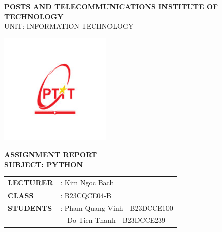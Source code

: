 \documentclass[a4paper,12pt]{article}
\begin{document}

\begin{center}

    {\Large \textbf{POSTS AND TELECOMMUNICATIONS INSTITUTE OF TECHNOLOGY}} \\
    \vspace{0.2cm}
    {\small UNIT: INFORMATION TECHNOLOGY} \\
    \vspace{0.5cm}
    
    \includegraphics[width=0.4\textwidth]{images/logo.png} \\
    \vspace{0.5cm}
    
    {\Large \textbf{ASSIGNMENT REPORT}} \\
    \vspace{0.2cm}
    {\large \textbf{SUBJECT: PYTHON}} \\
    \vspace{1.5cm}
    
    \begin{center}
    \begin{tabular}{ll}
    \vspace{0.3cm}
    
    \textbf{LECTURER} & : Kim Ngoc Bach \\
    \vspace{0.3cm}
    
    \textbf{CLASS} & : B23CQCE04-B\\
    \vspace{0.3cm}
    
    \textbf{STUDENTS} & : Pham Quang Vinh - B23DCCE100\\
    & \ \ Do Tien Thanh - B23DCCE239
    \end{tabular}
    \end{center}
\end{center}
\newpage
\end{document}
